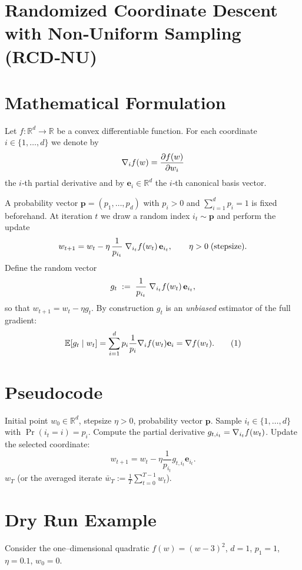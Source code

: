 \documentclass{article}
\newcommand{\E}{\mathbb{E}}
\newcommand{\R}{\mathbb{R}}
\newcommand{\grad}[1]{\nabla #1}
\newcommand{\e}{\mathbf{e}}
\newcommand{\p}{\mathbf{p}}
\begin{document}
\section*{Randomized Coordinate Descent with Non‑Uniform Sampling (RCD‑NU)}

\section*{Mathematical Formulation}
Let $f:\R^{d}\rightarrow\R$ be a convex differentiable function.  
For each coordinate $i\in\{1,\dots,d\}$ we denote by 
\[
\grad_i f(w)=\frac{\partial f(w)}{\partial w_i}
\]
the $i$‑th partial derivative and by $\e_i\in\R^{d}$ the $i$‑th canonical basis vector.

A probability vector $\p=(p_1,\dots,p_d)$ with $p_i>0$ and $\sum_{i=1}^{d}p_i=1$ is fixed beforehand.  
At iteration $t$ we draw a random index $i_t\sim \p$ and perform the update
\begin{equation}
\label{eq:update}
w_{t+1}= w_t - \eta\,\frac{1}{p_{i_t}}\;\grad_{i_t} f(w_t)\,\e_{i_t},
\qquad \eta>0\;\text{(stepsize)} .
\end{equation}
Define the random vector
\[
g_t \;:=\; \frac{1}{p_{i_t}}\;\grad_{i_t} f(w_t)\,\e_{i_t},
\]
so that $w_{t+1}=w_t-\eta g_t$.  By construction $g_t$ is an \emph{unbiased} estimator of the full gradient:
\[
\E\!\left[g_t\mid w_t\right]=\sum_{i=1}^{d}p_i\frac{1}{p_i}\grad_i f(w_t)\e_i
= \grad f(w_t).
\tag{1}
\]

\section*{Pseudocode}
\begin{algorithm}[H]
\caption{RCD‑NU}
\begin{algorithmic}[1]
\REQUIRE Initial point $w_0\in\R^{d}$, stepsize $\eta>0$, probability vector $\p$.
    \STATE Sample $i_t\in\{1,\dots,d\}$ with $\Pr(i_t=i)=p_i$.
    \STATE Compute the partial derivative $g_{t,i_t}= \grad_{i_t}f(w_t)$.
    \STATE Update the selected coordinate:
    \[
    w_{t+1}=w_t-\eta\frac{1}{p_{i_t}} g_{t,i_t}\e_{i_t}.
    \]
\ENDFOR
\RETURN $w_T$ (or the averaged iterate $\bar w_T:=\tfrac1T\sum_{t=0}^{T-1}w_t$).
\end{algorithmic}
\end{algorithm}

\section*{Dry Run Example}
Consider the one–dimensional quadratic $f(w)=(w-3)^2$, $d=1$, $p_1=1$, $\eta=0.1$, $w_0=0$.
\end{document}
